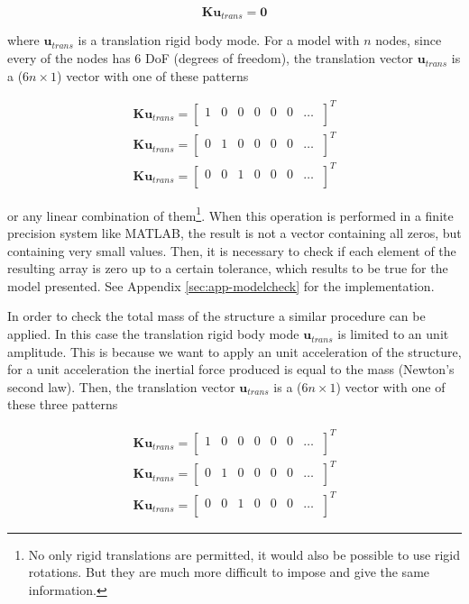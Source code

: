 \documentclass[AMdocument,optEnglish]{AMlatex}  %
\begin{document}
\begin{equation}
	\bm{K} \bm{u}_{trans} = \bm{0}
\end{equation}

where $\bm{u}_{trans}$ is a translation rigid body mode. For a model with $n$ nodes, since every of the nodes has 6 DoF (degrees of freedom), the translation vector $\bm{u}_{trans}$ is a ($6n \times 1$) vector with one of these patterns

\begin{align*}
	\bm{K} \bm{u}_{trans} = 
	\begin{bmatrix}
		1 & 0 & 0 & 0 & 0 & 0 & \ldots \ \\
	\end{bmatrix}^{T} \\
	\bm{K} \bm{u}_{trans} = 
	\begin{bmatrix}
		0 & 1 & 0 & 0 & 0 & 0 & \ldots \ \\
	\end{bmatrix}^{T} \\
	\bm{K} \bm{u}_{trans} = 
	\begin{bmatrix}
		0 & 0 & 1 & 0 & 0 & 0 & \ldots \ \\
	\end{bmatrix}^{T} 
\end{align*}

or any linear combination of them\footnote{No only rigid translations are permitted, it would also be possible to use rigid rotations. But they are much more difficult to impose and give the same information.}. When this operation is performed in a finite precision system like MATLAB, the result is not a vector containing all zeros, but containing very small values. Then, it is necessary to check if each element of the resulting array is zero up to a certain tolerance, which results to be true for the model presented. See Appendix \ref{sec:app-modelcheck} for the implementation.

In order to check the total mass of the structure a similar procedure can be applied. In this case the translation rigid body mode $\bm{u}_{trans}$ is limited to an unit amplitude. This is because we want to apply an unit acceleration of the structure, for a unit acceleration the inertial force produced is equal to the mass (Newton's second law). Then, the translation vector $\bm{u}_{trans}$ is a ($6n \times 1$) vector with one of these three patterns

\begin{align*}
	\bm{K} \bm{u}_{trans} = 
	\begin{bmatrix}
		1 & 0 & 0 & 0 & 0 & 0 & \ldots \ \\
	\end{bmatrix}^{T} \\
	\bm{K} \bm{u}_{trans} = 
	\begin{bmatrix}
		0 & 1 & 0 & 0 & 0 & 0 & \ldots \ \\
	\end{bmatrix}^{T} \\
	\bm{K} \bm{u}_{trans} = 
	\begin{bmatrix}
		0 & 0 & 1 & 0 & 0 & 0 & \ldots \ \\
	\end{bmatrix}^{T} 
\end{align*}
\end{document}
